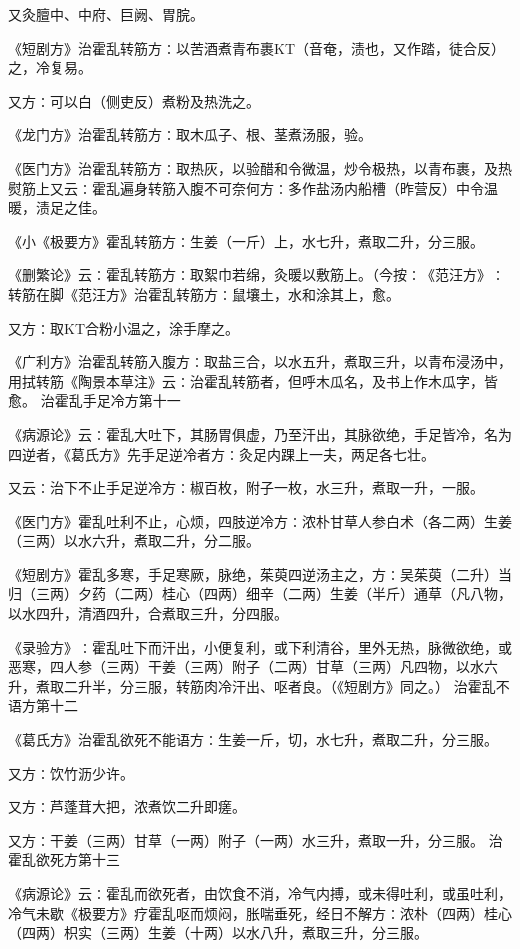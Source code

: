\documentclass[a4paper,12pt,UTF8,twoside]{ctexbook}
\begin{document}
又灸膻中、中府、巨阙、胃脘。

《短剧方》治霍乱转筋方∶以苦酒煮青布裹KT（音奄，渍也，又作踏，徒合反）之，冷复易。

又方∶可以白（侧吏反）煮粉及热洗之。

《龙门方》治霍乱转筋方∶取木瓜子、根、茎煮汤服，验。

《医门方》治霍乱转筋方∶取热灰，以验醋和令微温，炒令极热，以青布裹，及热熨筋上又云∶霍乱遍身转筋入腹不可奈何方∶多作盐汤内船槽（昨营反）中令温暖，渍足之佳。

《小《极要方》霍乱转筋方∶生姜（一斤）上，水七升，煮取二升，分三服。

《删繁论》云∶霍乱转筋方∶取絮巾若绵，灸暖以敷筋上。（今按∶《范汪方》∶转筋在脚《范汪方》治霍乱转筋方∶鼠壤土，水和涂其上，愈。

又方∶取KT合粉小温之，涂手摩之。

《广利方》治霍乱转筋入腹方∶取盐三合，以水五升，煮取三升，以青布浸汤中，用拭转筋《陶景本草注》云∶治霍乱转筋者，但呼木瓜名，及书上作木瓜字，皆愈。
治霍乱手足冷方第十一

《病源论》云∶霍乱大吐下，其肠胃俱虚，乃至汗出，其脉欲绝，手足皆冷，名为四逆者，《葛氏方》先手足逆冷者方∶灸足内踝上一夫，两足各七壮。

又云∶治下不止手足逆冷方∶椒百枚，附子一枚，水三升，煮取一升，一服。

《医门方》霍乱吐利不止，心烦，四肢逆冷方∶浓朴甘草人参白术（各二两）生姜（三两）以水六升，煮取二升，分二服。

《短剧方》霍乱多寒，手足寒厥，脉绝，茱萸四逆汤主之，方∶吴茱萸（二升）当归（三两）夕药（二两）桂心（四两）细辛（二两）生姜（半斤）通草（凡八物，以水四升，清酒四升，合煮取三升，分四服。

《录验方》∶霍乱吐下而汗出，小便复利，或下利清谷，里外无热，脉微欲绝，或恶寒，四人参（三两）干姜（三两）附子（二两）甘草（三两）凡四物，以水六升，煮取二升半，分三服，转筋肉冷汗出、呕者良。（《短剧方》同之。）
治霍乱不语方第十二

《葛氏方》治霍乱欲死不能语方∶生姜一斤，切，水七升，煮取二升，分三服。

又方∶饮竹沥少许。

又方∶芦蓬茸大把，浓煮饮二升即瘥。

又方∶干姜（三两）甘草（一两）附子（一两）水三升，煮取一升，分三服。
治霍乱欲死方第十三

《病源论》云∶霍乱而欲死者，由饮食不消，冷气内搏，或未得吐利，或虽吐利，冷气未歇《极要方》疗霍乱呕而烦闷，胀喘垂死，经日不解方∶浓朴（四两）桂心（四两）枳实（三两）生姜（十两）以水八升，煮取三升，分三服。
\end{document}
